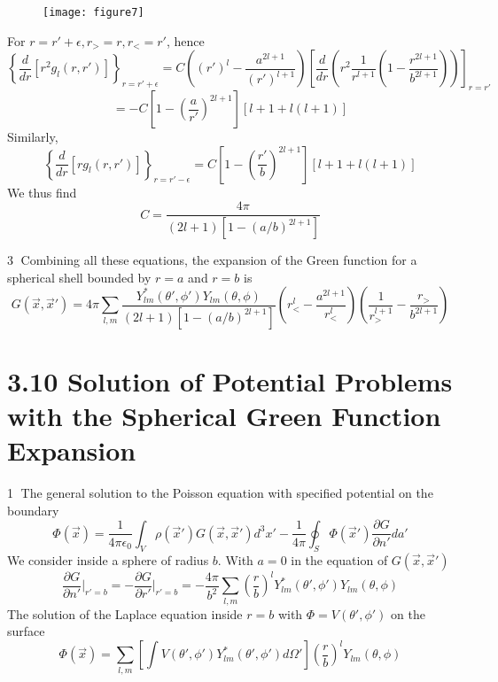 \documentclass{article}
\begin{document}
	\begin{figure}[h]
		\centering
		\texttt{[image: figure7]}
		\caption{}
		\label{fig:figure7}
	\end{figure}
	
	For $r=r'+\epsilon, r_>=r, r_<=r'$, hence
	\begin{equation*}
		\left\{ \frac{d}{dr} [r^2 g_l(r,r')] \right\}_{r=r'+\epsilon} = C \left( (r')^l - \frac{a^{2l+1}}{(r')^{l+1}} \right) \left[ \frac{d}{dr} \left( r^2 \frac{1}{r^{l+1}} \left( 1 - \frac{r^{2l+1}}{b^{2l+1}} \right) \right) \right]_{r=r'}
	\end{equation*}
	\begin{equation*}
		= -C \left[ 1 - \left(\frac{a}{r'}\right)^{2l+1} \right] [l+1+l(l+1)]
	\end{equation*}
	Similarly,
	\begin{equation*}
		\left\{ \frac{d}{dr} [r g_l(r,r')] \right\}_{r=r'-\epsilon} = C \left[ 1 - \left(\frac{r'}{b}\right)^{2l+1} \right] [l+1+l(l+1)]
	\end{equation*}
	We thus find
	\begin{equation*}
		C = \frac{4\pi}{(2l+1) [1-(a/b)^{2l+1}]}
	\end{equation*}
	
	\textcircled{3} Combining all these equations, the expansion of the Green function for a spherical shell bounded by $r=a$ and $r=b$ is
	\begin{equation*}
		G(\vec{x},\vec{x}') = 4\pi \sum_{l,m} \frac{Y_{lm}^*(\theta', \phi')Y_{lm}(\theta,\phi)}{(2l+1)[1-(a/b)^{2l+1}]} \left( r_<^l - \frac{a^{2l+1}}{r_<^l} \right) \left( \frac{1}{r_>^{l+1}} - \frac{r_>}{b^{2l+1}} \right)
	\end{equation*}
	
	\section*{3.10 Solution of Potential Problems with the Spherical Green Function Expansion}
	\textcircled{1} The general solution to the Poisson equation with specified potential on the boundary
	\begin{equation*}
		\Phi(\vec{x}) = \frac{1}{4\pi\epsilon_0} \int_V \rho(\vec{x}') G(\vec{x},\vec{x}') d^3x' - \frac{1}{4\pi} \oint_S \Phi(\vec{x}') \frac{\partial G}{\partial n'} da'
	\end{equation*}
	We consider inside a sphere of radius $b$.
	With $a=0$ in the equation of $G(\vec{x},\vec{x}')$
	\begin{equation*}
		\frac{\partial G}{\partial n'} \Big|_{r'=b} = -\frac{\partial G}{\partial r'}\Big|_{r'=b} = - \frac{4\pi}{b^2} \sum_{l,m} \left(\frac{r}{b}\right)^l Y_{lm}^*(\theta', \phi') Y_{lm}(\theta,\phi)
	\end{equation*}
	The solution of the Laplace equation inside $r=b$ with $\Phi=V(\theta', \phi')$ on the surface
	\begin{equation*}
		\Phi(\vec{x}) = \sum_{l,m} \left[ \int V(\theta', \phi') Y_{lm}^*(\theta', \phi') d\Omega' \right] \left(\frac{r}{b}\right)^l Y_{lm}(\theta,\phi)
	\end{equation*}
	
\end{document}
